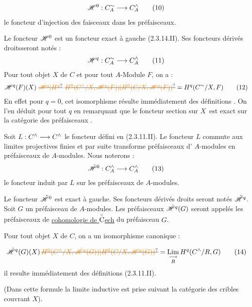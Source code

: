 \[
\handwritten{\mathscr H^0}:C_A^{\handwritten{\sim}}\handwritten{\longrightarrow}C_A^{\handwritten{\wedge}}\tag*{\handwritten{(10)}}
\]
le foncteur d'injection des faisceaux dans les préfaisceaux.

Le foncteur $\mathscr H^0$ est un foncteur exact à gauche (2.3.14.II). Ses foncteurs dérivés droitsseront notés :
\[
\handwritten{\mathscr H^q}:C_A^{\handwritten{\sim}}\handwritten{\longrightarrow}C_A^{\handwritten{\wedge}}\tag*{\handwritten{(11)}}
\]
Pour tout objet $X$ de $C$  et pour tout $A$-Module $F$, on a :
\[
\handwritten{\mathscr H^q(F)(X)}\ \deleted{\unsure{\mathscr H^q|H^q}}\ 
\deleted{\unsure{H^0(C^{\wedge}/X,\mathscr H^q(F))|H^0(C/X,\mathscr H^q(F))}}=H^q(C^{\handwritten{\sim}}/X,F)\tag*{\handwritten{(12)}}
\]
En effet pour $q=0$, cet isomorphisme résulte immédiatement des définitions . On l'en déduit pour tout $q$ en remarquant que le foncteur section sur $X$\ est exact  sur la catégorie des préfaisceaux .

Soit $L:C^{\wedge}\longrightarrow C^{\wedge}$ le foncteur défini en (2.3.11.II). Le foncteur $L$ commute aux limites projectives finies et par suite transforme  préfaisceaux d' $A$-modules en préfaisceaux de $A$-modules. Nous noterons :
\[
\handwritten{\check{\mathscr H}^{0}}:C_A^{\handwritten{\wedge}}\handwritten{\longrightarrow}C_A^{\handwritten{\wedge}}\tag*{\handwritten{(13)}}
\]
le foncteur induit par $L$ sur les préfaisceaux de $A$-modules.

Le foncteur $\check{\mathscr H}^0$ est exact à  gauche. Ses foncteurs dérivés droits seront notés $\check{\mathscr H}^q$.  Soit $G$ un préfaisceau de $A$-modules. Les préfaisceaux $\check{\mathscr H}^q(G)$ seront appelés les préfaisceaux de \uline{cohomologie de $\overset{\scriptscriptstyle\vee}{\text{C}}$ech} du préfaisceau $G$.

Pour tout objet $X$ de $C$, on a un isomorphisme canonique :


\[
\handwritten{\check{\mathscr H}^q(G)(X)}\,\deleted{\unsure{H^0(C^\wedge/X,\check{\mathscr H}^q(G))|H^0(C/X,\mathscr H^q(G))}}=
\mathop{\underset{\handwritten{\longrightarrow}}{\mathrm{Lim}}}_R H^q(C^{\handwritten{\wedge}}/R,G)\tag*{\handwritten{(14)}}
\]
 il resulte immédiatement des définitions (2.3.11.II).

(Dans cette formule la limite inductive est prise suivant la catégorie des cribles couvrant $X$).
